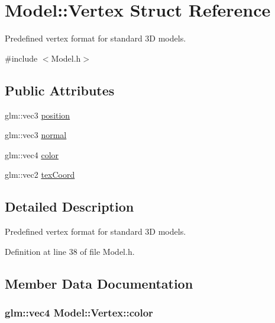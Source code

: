 \hypertarget{struct_model_1_1_vertex}{}\section{Model\+:\+:Vertex Struct Reference}
\label{struct_model_1_1_vertex}


Predefined vertex format for standard 3D models.  




{\ttfamily \#include $<$Model.\+h$>$}

\subsection*{Public Attributes}
\begin{DoxyCompactItemize}
\item 
glm\+::vec3 \hyperlink{struct_model_1_1_vertex_a27d09cad05dd2a74b8aa44f934441a9e}{position}
\item 
glm\+::vec3 \hyperlink{struct_model_1_1_vertex_a75c5e19722462c1ef8a5ba863db069ea}{normal}
\item 
glm\+::vec4 \hyperlink{struct_model_1_1_vertex_a5523bdc6906902bc1d88fb01cae1b550}{color}
\item 
glm\+::vec2 \hyperlink{struct_model_1_1_vertex_a45595f4db5a1dc76d9a47434b1eea559}{tex\+Coord}
\end{DoxyCompactItemize}


\subsection{Detailed Description}
Predefined vertex format for standard 3D models. 

Definition at line 38 of file Model.\+h.



\subsection{Member Data Documentation}
\subsubsection[{\texorpdfstring{color}{color}}]{\setlength{\rightskip}{0pt plus 5cm}glm\+::vec4 Model\+::\+Vertex\+::color}\hypertarget{struct_model_1_1_vertex_a5523bdc6906902bc1d88fb01cae1b550}{}\label{struct_model_1_1_vertex_a5523bdc6906902bc1d88fb01cae1b550}



